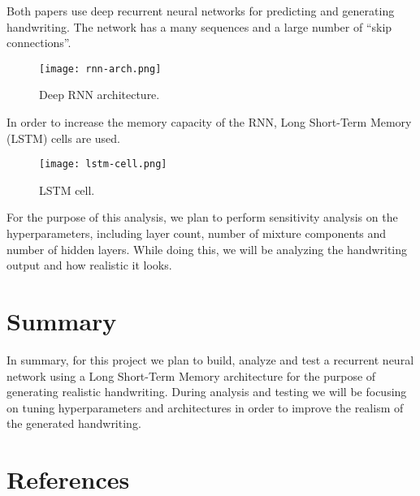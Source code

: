 \documentclass{article}
\begin{document}
Both papers use deep recurrent neural networks for
predicting and generating handwriting.
The network has a many sequences and a
large number of ``skip connections''.

\begin{figure}[H]
    \centering
    \texttt{[image: rnn-arch.png]}
    \caption{Deep RNN architecture.}
\end{figure}

In order to increase the memory capacity of the RNN,
Long Short-Term Memory (LSTM) cells are used.

\begin{figure}[H]
    \centering
    \texttt{[image: lstm-cell.png]}
    \caption{LSTM cell.}
\end{figure}

For the purpose of this analysis,
we plan to perform sensitivity analysis on the
hyperparameters, including layer count, number of mixture components and number of hidden layers.
While doing this, we will be analyzing the handwriting output and how realistic it looks.

\section{Summary}

In summary,
for this project we plan to build, analyze and test
a recurrent neural network using a Long Short-Term Memory architecture for the purpose of generating realistic handwriting.
During analysis and testing we will be focusing on
tuning hyperparameters and architectures
in order to improve the realism of the generated handwriting.

\section{References}

{
\small

}
\end{document}
